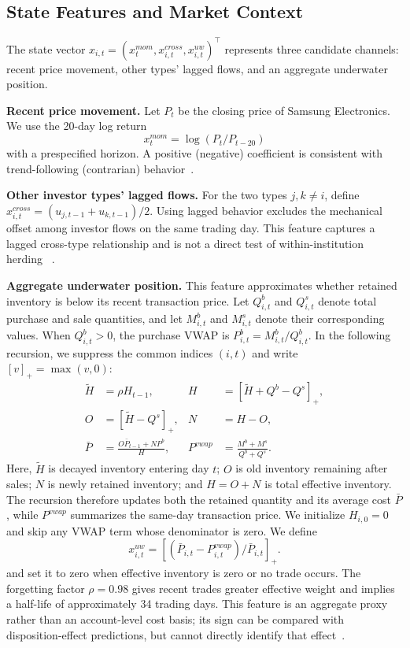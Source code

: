 \subsection{State Features and Market Context}
\label{sec:features}

The state vector
$x_{i,t}=(x^{mom}_{t},x^{cross}_{i,t},x^{uw}_{i,t})^\top$ represents three candidate
channels: recent price movement, other types' lagged flows, and an aggregate underwater
position.

\textbf{Recent price movement.}
Let $P_t$ be the closing price of Samsung Electronics. We use the 20-day log return
\[
x^{mom}_{t}=\log(P_t/P_{t-20})
\]
with a prespecified horizon. A positive (negative) coefficient is consistent with
trend-following (contrarian) behavior~\cite{grinblatt2000investment,choe1999foreign}.

\textbf{Other investor types' lagged flows.}
For the two types $j,k\ne i$, define
$x^{cross}_{i,t}=(u_{j,t-1}+u_{k,t-1})/2$. Using lagged behavior excludes the mechanical
offset among investor flows on the same trading day. This feature captures a lagged
cross-type relationship and is not a direct test of within-institution herding
~\cite{lakonishok1992impact}.

\textbf{Aggregate underwater position.}
This feature approximates whether retained inventory is below its recent transaction price.
Let $Q^b_{i,t}$ and $Q^s_{i,t}$ denote total purchase and sale
quantities, and let $M^b_{i,t}$ and $M^s_{i,t}$ denote their corresponding values. When
$Q^b_{i,t}>0$, the purchase VWAP is $P^b_{i,t}=M^b_{i,t}/Q^b_{i,t}$. In the following
recursion, we suppress the common indices $(i,t)$ and write $[v]_+=\max(v,0)$:
\begin{equation}
\begin{aligned}
\widetilde H&=\rho H_{t-1}, & H&=[\widetilde H+Q^b-Q^s]_+,\\
O&=[\widetilde H-Q^s]_+, & N&=H-O,\\
\bar P&=\frac{O\bar P_{t-1}+NP^b}{H},&
P^{vwap}&=\frac{M^b+M^s}{Q^b+Q^s}.
\end{aligned}
\label{eq:cost}
\end{equation}
Here, $\widetilde H$ is decayed inventory entering day $t$; $O$ is old inventory remaining
after sales; $N$ is newly retained inventory; and $H=O+N$ is total effective inventory.
The recursion therefore updates both the retained quantity and its average cost $\bar P$,
while $P^{vwap}$ summarizes the same-day transaction price. We initialize $H_{i,0}=0$ and
skip any VWAP term whose denominator is zero. We define
\[
x^{uw}_{i,t}=\left[(\bar P_{i,t}-P^{vwap}_{i,t})/\bar P_{i,t}\right]_+ .
\]
and set it to zero when effective inventory is zero or no trade occurs. The forgetting
factor $\rho=0.98$ gives recent trades greater effective weight and implies a half-life of
approximately 34 trading days. This feature is an aggregate proxy rather than an
account-level cost basis; its sign can be compared with disposition-effect predictions,
but cannot directly identify that effect~\cite{shefrin1985disposition,odean1998investors}.


